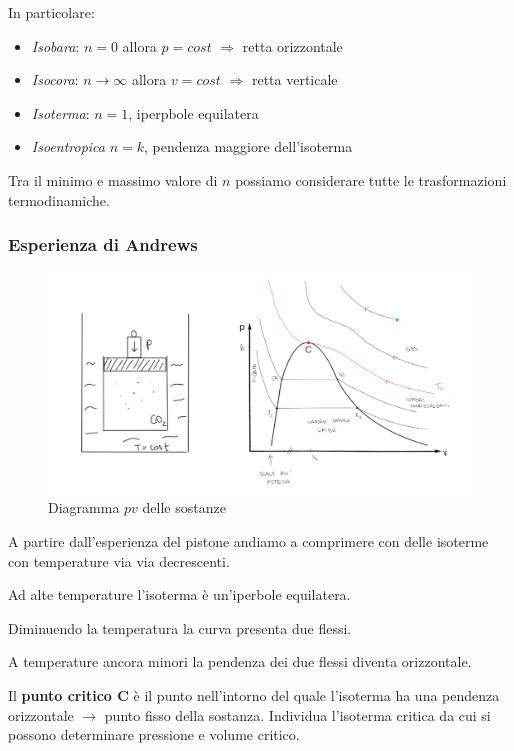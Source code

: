 \documentclass[a4paper]{article}
\numberwithin{equation}{section}%
\begin{document}
In particolare:
\begin{itemize}
	\item \textit{Isobara}: $n=0$ allora $p=cost$ $\Rightarrow$ retta orizzontale
\item \textit{Isocora}: $n\to \infty$ allora $v=cost$ $\Rightarrow$ retta verticale 
\item \textit{Isoterma}: $n=1$, iperpbole equilatera
	\item \textit{Isoentropica} $n=k$, pendenza maggiore dell'isoterma
\end{itemize}

Tra il minimo e massimo valore di $n$ possiamo considerare tutte le trasformazioni termodinamiche.


\subsubsection{Esperienza di Andrews}

\begin{figure}[H]
	\begin{center}
		\includegraphics[width=0.8\columnwidth]{andrews.png}
		\caption{Diagramma $pv$ delle sostanze}
	\end{center}
\end{figure}

A partire dall'esperienza del pistone andiamo a comprimere con delle isoterme con temperature via via decrescenti. 

Ad alte temperature l'isoterma è un'iperbole equilatera.

Diminuendo la temperatura la curva presenta due flessi. 

A temperature ancora minori la pendenza dei due flessi diventa orizzontale. 

Il \textbf{punto critico C} è il punto nell'intorno del quale l'isoterma ha una pendenza orizzontale $\longrightarrow$ punto fisso della sostanza. Individua l'isoterma critica da cui si possono determinare pressione e volume critico.
\end{document}

